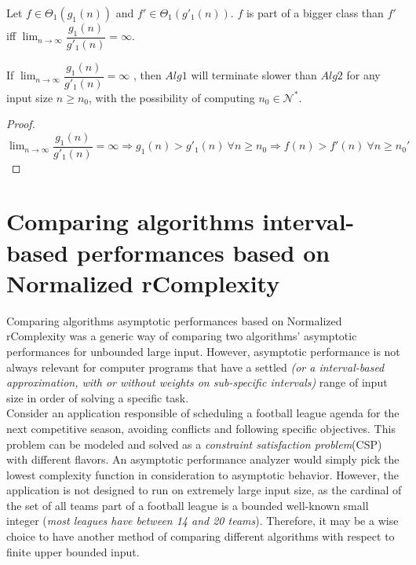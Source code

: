 \begin{definition}
Let $f \in \Theta_{1}(g_{1}(n))$ and $f' \in \Theta_{1}(g'_{1}(n))$. $f$ is part of a bigger class than $f'$ iff $\lim_{n\to\infty} \dfrac{g_{1}(n)}{g'_{1}(n)} = \infty$.
\end{definition}
\begin{lemma}
If  $ \lim_{n\to\infty} \dfrac{g_{1}(n)}{g'_{1}(n)} = \infty $ , then $Alg1$ will terminate slower than $Alg2$ for any input size $n \geq n_{0}$, with the possibility of computing $n_{0} \in \mathcal{N}^{*}$.
\end{lemma}
\begin{proof}
$\lim_{n\to\infty} \dfrac{g_{1}(n)}{g'_{1}(n)} = \infty \Rightarrow g_{1}(n) > g'_{1}(n)\ \forall n \geq n_{0} \Rightarrow f(n) > f'(n) \ \forall n \geq n_{0}'$
\end{proof}

\section{Comparing algorithms interval-based performances based on Normalized rComplexity}
Comparing algorithms asymptotic performances based on Normalized rComplexity was a generic way of comparing two algorithms' asymptotic performances for unbounded large input. However, asymptotic performance is not always relevant for computer programs that have a settled \textit{(or a interval-based approximation, with or without weights on sub-specific intervals)} range of input size in order of solving a specific task. 
\\ Consider an application responsible of scheduling a football league agenda for the next competitive season, avoiding conflicts and following specific objectives. This problem can be modeled and solved as a \textit{constraint satisfaction problem}(CSP) with different flavors.  An asymptotic performance analyzer would simply pick the lowest complexity function in consideration to asymptotic behavior. However, the application is not designed to run on extremely large input size, as the cardinal of the set of all teams part of a football league is a bounded well-known small integer (\textit{most leagues have between 14 and 20 teams}). Therefore, it may be a wise choice to have another method of comparing different algorithms with respect to finite upper bounded input.

